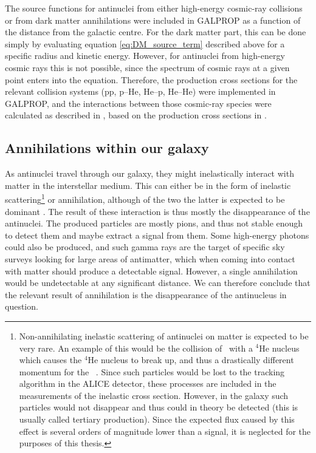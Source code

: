 The source functions for antinuclei from either high-energy cosmic-ray collisions or from dark matter annihilations were included in GALPROP as a function of the distance from the galactic centre. For the dark matter part, this can be done simply by evaluating equation \ref{eq:DM_source_term} described above for a specific radius and kinetic energy. However, for antinuclei from high-energy cosmic rays this is not possible, since the spectrum of cosmic rays at a given point enters into the equation. Therefore, the production cross sections for the relevant collision systems (pp, p--He, He--p, He--He) were implemented in GALPROP, and the interactions between those cosmic-ray species were calculated as described in \cite{ALICE-PUBLIC-2022-001}, based on the production cross sections in \cite{}. 

\subsection{Annihilations within our galaxy}\label{sec:ResAnnInOurGalaxy}
As antinuclei travel through our galaxy, they might inelastically interact with matter in the interstellar medium. This can either be in the form of inelastic scattering\footnote{Non-annihilating inelastic scattering of antinuclei on matter is expected to be very rare. An example of this would be the collision of \ahe\ with a $^4\mathrm{He}$ nucleus which causes the $^4\mathrm{He}$ nucleus to break up, and thus a drastically different momentum for the \ahe\ . Since such particles would be lost to the tracking algorithm in the ALICE detector, these processes are included in the measurements of the inelastic cross section. However, in the galaxy such particles would not disappear and thus could in theory be detected (this is usually called tertiary production). Since the expected flux caused by this effect is several orders of magnitude lower than a signal, it is neglected for the purposes of this thesis.} or annihilation, although of the two the latter is expected to be dominant \cite{}. The result of these interaction is thus mostly the disappearance of the antinuclei. The produced particles are mostly pions, and thus not stable enough to detect them and maybe extract a signal from them. Some high-energy photons could also be produced, and such gamma rays are the target of specific sky surveys looking for large areas of antimatter, which when coming into contact with matter should produce a detectable signal. However, a single annihilation would be undetectable at any significant distance. We can therefore conclude that the relevant result of annihilation is the disappearance of the antinucleus in question. \\

